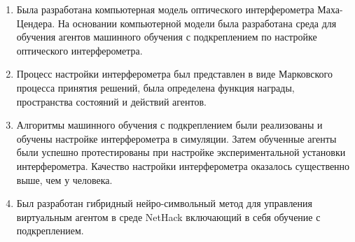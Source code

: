 \begin{enumerate}
  \item Была разработана компьютерная модель оптического интерферометра Маха-Цендера. На основании компьютерной модели была разработана среда для обучения агентов машинного обучения с подкреплением по настройке оптического интерферометра. 
  \item Процесс настройки интерферометра был представлен в виде Марковского процесса принятия решений, была определена функция награды, пространства состояний и действий агентов. 
  \item Алгоритмы машинного обучения с подкреплением были реализованы и обучены настройке интерферометра в симуляции. Затем обученные агенты были успешно протестированы при настройке экспериментальной установки интерферометра. Качество настройки интерферометра оказалось существенно выше, чем у человека. 
  \item Был разработан гибридный нейро-символьный метод для управления виртуальным агентом в среде NetHack включающий в себя обучение с подкреплением. 
\end{enumerate}

\newpage
